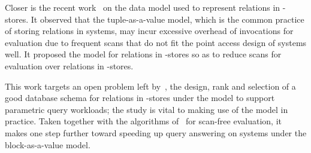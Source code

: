 Closer %
is the recent work~\cite{VLDB19} on the data model used to
represent relations in \kv-stores. It observed that the
tuple-as-a-value model, which is the common practice of storing
relations in \kv systems, may incur excessive overhead of \get
invocations for \SQL evaluation due to %
frequent %
scans
that do not fit  the point access design of \kv systems well.
It proposed the \baav model for relations in \kv-stores so as to
reduce scans for \SQL evaluation over relations in \kv-stores.

\vspace{0.36ex}
This work targets an open problem left by~\cite{VLDB19}, \ie
the design, rank and
selection of a good database schema for relations in \kv-stores
under the \baav model to support parametric query workloads; the
study is vital to making use of the \baav model in practice.
Taken together with the algorithms of~\cite{VLDB19} for
scan-free evaluation, it makes one step further toward speeding
up \SQL query answering on \kv systems under the
block-as-a-value model.



